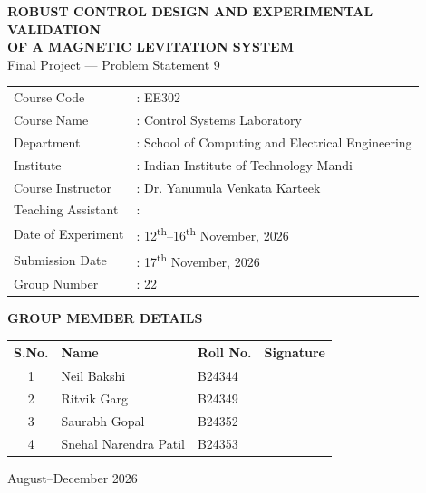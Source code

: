 \documentclass[11pt,a4paper]{article}
\begin{document}
\begin{titlepage}
\thispagestyle{empty}

\begin{center}
{\LARGE\bfseries ROBUST CONTROL DESIGN AND EXPERIMENTAL VALIDATION\\[4pt] OF A MAGNETIC LEVITATION SYSTEM}\\[14pt]
{\large Final Project --- Problem Statement 9}
\end{center}

\vspace{1.4cm}
\noindent
\begin{tabular}{@{}p{3.8cm}l@{}}
Course Code & : EE302 \\[4pt]
Course Name & : Control Systems Laboratory \\[4pt]
Department & : School of Computing and Electrical Engineering \\[4pt]
Institute & : Indian Institute of Technology Mandi \\[4pt]
Course Instructor & : Dr. Yanumula Venkata Karteek \\[4pt]
Teaching Assistant & : \\[4pt]
Date of Experiment & : 12\textsuperscript{th}--16\textsuperscript{th} November, 2026 \\[4pt]
Submission Date & : 17\textsuperscript{th} November, 2026 \\[4pt]
Group Number & : 22 \\
\end{tabular}

\vspace{1.6cm}
\begin{center}
{\bfseries GROUP MEMBER DETAILS}\\[8pt]
\begin{tabular}{@{}clll@{}}
\toprule
S.No. & Name & Roll No. & Signature \\
\midrule
1 & Neil Bakshi & B24344 & \hspace{3cm} \\[8pt]
2 & Ritvik Garg & B24349 & \\[8pt]
3 & Saurabh Gopal & B24352 & \\[8pt]
4 & Snehal Narendra Patil & B24353 & \\[8pt]
\bottomrule
\end{tabular}
\end{center}

\vfill
\begin{center}
August--December 2026
\end{center}

\end{titlepage}
\end{document}
